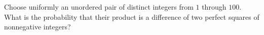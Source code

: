 Choose uniformly an unordered pair of distinct integers from $1$ through $100$. What is the probability that their product is a difference of two perfect squares of nonnegative integers?
